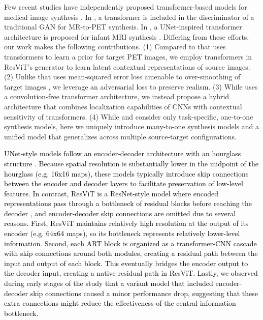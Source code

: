\documentclass[journal,twoside,web]{ieeecolor}
\newcommand*{\revhl}{\textcolor{black}}
\begin{document}
\par
Few recent studies have independently proposed transformer-based models for medical image synthesis \cite{ganbert,ptnet,kamran2021}. In \cite{ganbert}, a transformer is included in the discriminator of a traditional GAN for MR-to-PET synthesis. In \cite{ptnet}, a UNet-inspired transformer architecture is proposed for infant MRI synthesis \cite{ptnet}. Differing from these efforts, our work makes the following contributions. (1) Compared to \cite{ganbert} that uses transformers to learn a prior for target PET images, we employ transformers in ResViT's generator to learn latent contextual representations of source images. (2) Unlike \cite{ptnet} that uses mean-squared error loss amenable to over-smoothing of target images \cite{pgan}, we leverage an adversarial loss to preserve realism. (3) While \cite{ptnet} uses a convolution-free transformer architecture, we instead propose a hybrid architecture that combines localization capabilities of CNNs with contextual sensitivity of transformers. (4) While \cite{ganbert} and \cite{ptnet} consider only task-specific, one-to-one synthesis models, here we uniquely introduce many-to-one synthesis models and a unified model that generalizes across multiple source-target configurations.

\par
\revhl{UNet-style models follow an encoder-decoder architecture with an hourglass structure \cite{pix2pix}. Because spatial resolution is substantially lower in the midpoint of the hourglass (e.g. 16x16 maps), these models typically introduce skip connections between the encoder and decoder layers to facilitate preservation of low-level features. In contrast, ResViT is a ResNet-style model where encoded representations pass through a bottleneck of residual blocks before reaching the decoder \cite{resnet}, and encoder-decoder skip connections are omitted due to several reasons. First, ResViT maintains relatively high resolution at the output of its encoder (e.g. 64x64 maps), so its bottleneck represents relatively lower-level information. Second, each ART block is organized as a transformer-CNN cascade with skip connections around both modules, creating a residual path between the input and output of each block. This eventually bridges the encoder output to the decoder input, creating a native residual path in ResViT. Lastly, we observed during early stages of the study that a variant model that included encoder-decoder skip connections caused a minor performance drop, suggesting that these extra connections might reduce the effectiveness of the central information bottleneck.}
\end{document}
